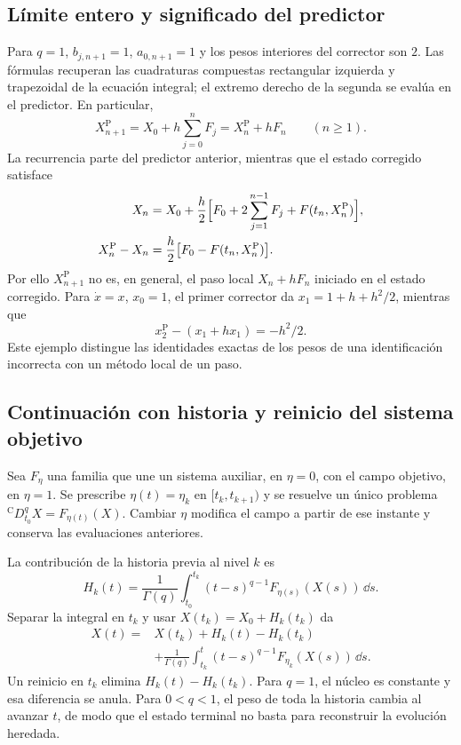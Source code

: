 \subsection{Límite entero y significado del predictor}
\label{bre:num:limite-entero}

Para $q=1$, $b_{j,n+1}=1$, $a_{0,n+1}=1$ y los pesos interiores del
corrector son $2$. Las fórmulas recuperan las cuadraturas compuestas
rectangular izquierda y trapezoidal de la ecuación integral; el extremo
derecho de la segunda se evalúa en el predictor. En particular,
\[
 X_{n+1}^{\mathrm P}=X_0+h\sum_{j=0}^{n}F_j
 =X_n^{\mathrm P}+hF_n\qquad(n\geq1).
\]
La recurrencia parte del predictor anterior, mientras que el estado corregido
satisface
\begin{align*}
 X_n&=X_0+\frac h2\Bigl[F_0+2\sum_{j=1}^{n-1}F_j
                         +F(t_n,X_n^{\mathrm P})\Bigr],\\
 X_n^{\mathrm P}-X_n&=\frac h2\bigl[F_0-F(t_n,X_n^{\mathrm P})\bigr].
\end{align*}
Por ello $X_{n+1}^{\mathrm P}$ no es, en general, el paso local
$X_n+hF_n$ iniciado en el estado corregido. Para $\dot x=x$, $x_0=1$, el
primer corrector da $x_1=1+h+h^2/2$, mientras que
\[
 x_2^{\mathrm P}-(x_1+hx_1)=-h^2/2.
\]
Este ejemplo distingue las identidades exactas de los pesos de una
identificación incorrecta con un método local de un paso.

\subsection{Continuación con historia y reinicio del sistema objetivo}
\label{bre:num:continuacion}

Sea $F_\eta$ una familia que une un sistema auxiliar, en $\eta=0$, con el
campo objetivo, en $\eta=1$. Se prescribe $\eta(t)=\eta_k$ en
$[t_k,t_{k+1})$ y se resuelve un único problema
${}^{\mathrm C}D_{t_0}^{q}X=F_{\eta(t)}(X)$. Cambiar $\eta$ modifica el
campo a partir de ese instante y conserva las evaluaciones anteriores.

La contribución de la historia previa al nivel $k$ es
\begin{equation}
 H_k(t)=\frac1{\Gamma(q)}\int_{t_0}^{t_k}
             (t-s)^{q-1}F_{\eta(s)}(X(s))\,\dd s.
 \label{bre:num:historia-heredada}
\end{equation}
Separar la integral en $t_k$ y usar $X(t_k)=X_0+H_k(t_k)$ da
\begin{equation}
 \begin{split}
 X(t)={}&X(t_k)+H_k(t)-H_k(t_k)\\
 &+\frac1{\Gamma(q)}\int_{t_k}^{t}
            (t-s)^{q-1}F_{\eta_k}(X(s))\,\dd s.
 \end{split}
 \label{bre:num:continuacion-integral}
\end{equation}
Un reinicio en $t_k$ elimina $H_k(t)-H_k(t_k)$. Para $q=1$, el núcleo es
constante y esa diferencia se anula. Para $0<q<1$, el peso de toda la
historia cambia al avanzar $t$, de modo que el estado terminal no basta para
reconstruir la evolución heredada.

